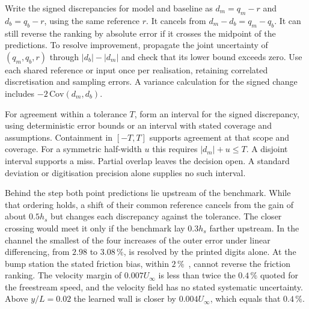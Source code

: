 \documentclass[pdflatex,sn-nature,iicol]{sn-jnl}
\begin{document}


Write the signed discrepancies for model and baseline as $d_m=q_m-r$ and $d_b=q_b-r$, using the same reference $r$. It cancels from $d_m-d_b=q_m-q_b$. It can still reverse the ranking by absolute error if it crosses the midpoint of the predictions. To resolve improvement, propagate the joint uncertainty of $(q_m,q_b,r)$ through $|d_b|-|d_m|$ and check that its lower bound exceeds zero. Use each shared reference or input once per realisation, retaining correlated discretisation and sampling errors. A variance calculation for the signed change includes $-2\,\mathrm{Cov}(d_m,d_b)$.

For agreement within a tolerance $T$, form an interval for the signed discrepancy, using deterministic error bounds or an interval with stated coverage and assumptions. Containment in $[-T,T]$ supports agreement at that scope and coverage. For a symmetric half-width $u$ this requires $|d_m|+u\le T$. A disjoint interval supports a miss. Partial overlap leaves the decision open. A standard deviation or digitisation precision alone supplies no such interval.



Behind the step both point predictions lie upstream of the benchmark. While that ordering holds, a shift of their common reference cancels from the gain of about $0.5h_s$ but changes each discrepancy against the tolerance. The closer crossing would meet it only if the benchmark lay $0.3h_s$ farther upstream. In the channel the smallest of the four increases of the outer error under linear differencing, from $2.98$ to $3.08\,\%$, is resolved by the printed digits alone. At the bump station the stated friction bias, within $2\,\%$~\cite{Gray2023}, cannot reverse the friction ranking. The velocity margin of $0.007U_\infty$ is less than twice the $0.4\,\%$ quoted for the freestream speed, and the velocity field has no stated systematic uncertainty. Above $y/L=0.02$ the learned wall is closer by $0.004U_\infty$, which equals that $0.4\,\%$.
\end{document}
